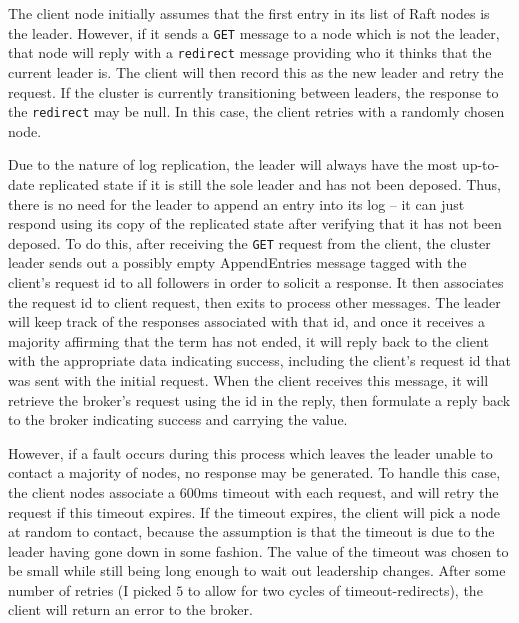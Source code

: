 \documentclass[psamsfonts]{amsart}
\begin{document}
The client node initially assumes that the first entry in its list of Raft nodes is the leader. However, if it sends a \verb|GET| message to a node which is not the leader, that node will reply with a \verb|redirect| message providing who it thinks that the current leader is. The client will then record this as the new leader and retry the request. If the cluster is currently transitioning between leaders, the response to the \verb|redirect| may be null. In this case, the client retries with a randomly chosen node.

Due to the nature of log replication, the leader will always have the most up-to-date replicated state if it is still the sole leader and has not been deposed. Thus, there is no need for the leader to append an entry into its log -- it can just respond using its copy of the replicated state after verifying that it has not been deposed. To do this, after receiving the \verb|GET| request from the client, the cluster leader sends out a possibly empty AppendEntries message tagged with the client's request id to all followers in order to solicit a response. It then associates the request id to client request, then exits to process other messages. The leader will keep track of the responses associated with that id, and once it receives a majority affirming that the term has not ended, it will reply back to the client with the appropriate data indicating success, including the client's request id that was sent with the initial request. When the client receives this message, it will retrieve the broker's request using the id in the reply, then formulate a reply back to the broker indicating success and carrying the value.

However, if a fault occurs during this process which leaves the leader unable to contact a majority of nodes, no response may be generated. To handle this case, the client nodes associate a $600$ms timeout with each request, and will retry the request if this timeout expires. If the timeout expires, the client will pick a node at random to contact, because the assumption is that the timeout is due to the leader having gone down in some fashion. The value of the timeout was chosen to be small while still being long enough to wait out leadership changes. After some number of retries (I picked $5$ to allow for two cycles of timeout-redirects), the client will return an error to the broker. 
\end{document}
